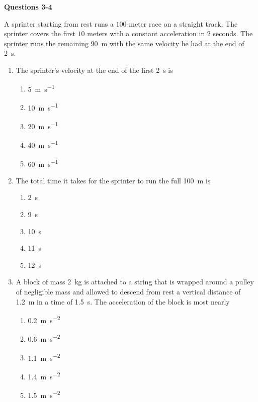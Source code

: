 \documentclass{../../oss-apphys}
\begin{document}
\begin{multicols}{2}
  \columnbreak
  \textbf{Questions 3-4}
  
  A sprinter starting from rest runs a $100$-meter race on a straight track. The
  sprinter covers the first $10$ meters with a constant acceleration in $2$
  seconds. The sprinter runs the remaining \SI{90}{m} with the same velocity he
  had at the end of \SI{2}{\second}.

  \begin{enumerate}[resume,leftmargin=18pt]
  \item The sprinter's velocity at the end of the first \SI{2}{\second} is
    \begin{enumerate}[noitemsep,topsep=0pt,leftmargin=18pt,label=(\Alph*)]
    \item\SI{5 }{\metre\per\second}
    \item\SI{10}{\metre\per\second}
    \item\SI{20}{\metre\per\second}
    \item\SI{40}{\metre\per\second}
    \item\SI{60}{\metre\per\second}
    \end{enumerate}

  \item The total time it takes for the sprinter to run the full \SI{100}{m} is
    \begin{enumerate}[noitemsep,topsep=0pt,leftmargin=18pt,label=(\Alph*)]
    \item\SI{2 }{\second}
    \item\SI{9 }{\second}
    \item\SI{10}{\second}
    \item\SI{11}{\second}
    \item\SI{12}{\second}
    \end{enumerate}
    \columnbreak
    
  \item A block of mass \SI{2}{\kilo\gram} is attached to a string that is
    wrapped around a pulley of negligible mass and allowed to descend from rest
    a vertical distance of \SI{1.2}{\metre} in a time of \SI{1.5}{\second}. The
    acceleration of the block is most nearly
    \begin{center}
      \vspace{-.2in}
    \end{center}
    \begin{enumerate}[noitemsep,topsep=0pt,leftmargin=18pt,label=(\Alph*)]
    \item\SI{0.2}{\metre\per\second^2}
    \item\SI{.6}{\metre\per\second^2}
    \item\SI{1.1}{\metre\per\second^2}
    \item\SI{1.4}{\metre\per\second^2}
    \item\SI{1.5}{\metre\per\second^2}
    \end{enumerate}


\end{enumerate}
\end{multicols}
\end{document}
